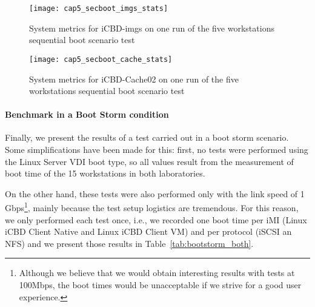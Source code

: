 \begin{figure}[htbp]
	\centering
	\texttt{[image: cap5\_secboot\_imgs\_stats]}
	\caption{System metrics for iCBD-imgs on one run of the five workstations sequential boot scenario test}
	\label{fig:boot_imgs_stats}
\end{figure}


\begin{figure}[htbp]
	\centering
	\texttt{[image: cap5\_secboot\_cache\_stats]}
	\caption{System metrics for iCBD-Cache02 on one run of the five workstations sequential boot scenario test}
	\label{fig:boot_cache_stats}
\end{figure}


\paragraph{Benchmark in a Boot Storm condition}
\label{par:eval_cache_bootstorm}




Finally, we present the results of a test carried out in a boot storm scenario. Some simplifications have been made for this: first, no tests were performed using the Linux Server VDI boot type, so all values result from the measurement of boot time of the 15 workstations in both laboratories.

On the other hand, these tests were also performed only with the link speed of 1 Gbps\footnote{Although we believe that we would obtain interesting results with tests at 100Mbps, the boot times would be unacceptable if we strive for a good user experience.}, mainly because the test setup logistics are tremendous. For this reason, we only performed each test once, i.e., we recorded one boot time per iMI (Linux iCBD Client Native and Linux iCBD Client VM) and per protocol (iSCSI an NFS) and we present those results in Table~\ref{tab:bootstorm_both}.


